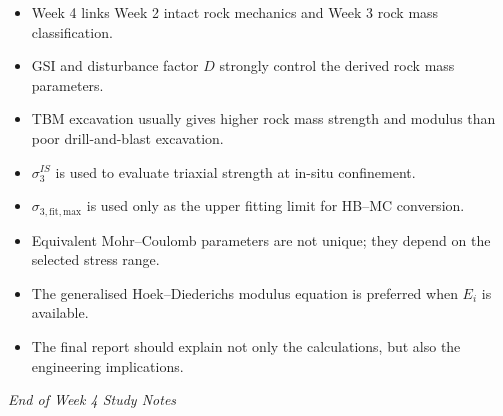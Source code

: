 \documentclass[a4paper,12pt]{article}
\begin{document}
\begin{itemize}
    \item Week 4 links Week 2 intact rock mechanics and Week 3 rock mass classification.
    \item GSI and disturbance factor \(D\) strongly control the derived rock mass parameters.
    \item TBM excavation usually gives higher rock mass strength and modulus than poor drill-and-blast excavation.
    \item \(\sigma_3^{IS}\) is used to evaluate triaxial strength at in-situ confinement.
    \item \(\sigma_{3,\mathrm{fit,max}}\) is used only as the upper fitting limit for HB--MC conversion.
    \item Equivalent Mohr--Coulomb parameters are not unique; they depend on the selected stress range.
    \item The generalised Hoek--Diederichs modulus equation is preferred when \(E_i\) is available.
    \item The final report should explain not only the calculations, but also the engineering implications.
\end{itemize}

\vspace{1cm}
\noindent\textit{End of Week 4 Study Notes}
\end{document}
